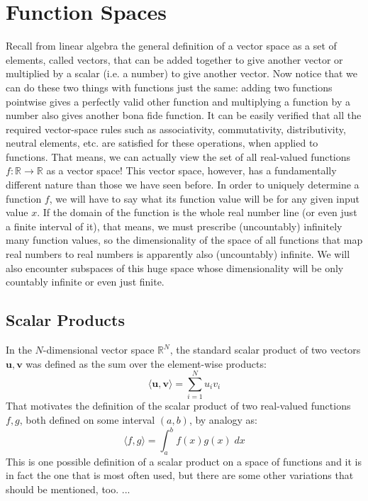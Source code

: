 \section{Function Spaces}
Recall from linear algebra the general definition of a vector space as a set of elements, called vectors, that can be added together to give another vector or multiplied by a scalar (i.e. a number) to give another vector. Now notice that we can do these two things with functions just the same: adding two functions pointwise gives a perfectly valid other function and multiplying a function by a number also gives another bona fide function. It can be easily verified that all the required vector-space rules such as associativity, commutativity, distributivity, neutral elements, etc. are satisfied for these operations, when applied to functions. That means, we can actually view the set of all real-valued functions $f: \mathbb{R \rightarrow R}$ as a vector space! This vector space, however, has a fundamentally different nature than those we have seen before. In order to uniquely determine a function $f$, we will have to say what its function value will be for any given input value $x$. If the domain of the function is the whole real number line (or even just a finite interval of it), that means, we must prescribe (uncountably) infinitely many function values, so the dimensionality of the space of all functions that map real numbers to real numbers is apparently also (uncountably) infinite. We will also encounter subspaces of this huge space whose dimensionality will be only countably infinite or even just finite.

\subsection{Scalar Products}
In the $N$-dimensional vector space $\mathbb{R}^N$, the standard scalar product of two vectors $\mathbf{u,v}$ was defined as the sum over the element-wise products:
\begin{equation}
 \langle \mathbf{u,v} \rangle = \sum_{i=1}^{N} u_i v_i
\end{equation}
That motivates the definition of the scalar product of two real-valued functions $f,g$, both defined on some interval $(a,b)$, by analogy as:
\begin{equation}
 \langle f,g \rangle = \int_a^b f(x) g(x) \; dx
\end{equation}
This is one possible definition of a scalar product on a space of functions and it is in fact the one that is most often used, but there are some other variations that should be mentioned, too. ...

